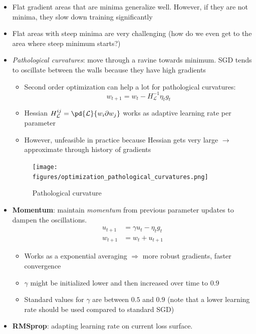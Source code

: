 \begin{itemize}
	\item Flat gradient areas that are minima generalize well. However, if they are not minima, they slow down training significantly
	\item Flat areas with steep minima are very challenging (how do we even get to the area where steep minimum starts?)
	\item \textit{Pathological curvatures}: move through a ravine towards minimum. SGD tends to oscillate between the walls because they have high gradients
	\begin{itemize}
		\item Second order optimization can help a lot for pathological curvatures: $$w_{t+1} = w_{t} - H_{\mathcal{L}}^{-1} \eta_t g_t$$
		\item Hessian $H_{\mathcal{L}}^{ij} = \pd{\mathcal{L}}{w_i\partial w_j}$ works as adaptive learning rate per parameter
		\item However, unfeasible in practice because Hessian gets very large $\rightarrow$ approximate through history of gradients
	\end{itemize}
	\begin{figure}[ht!]
		\centering
		\texttt{[image: figures/optimization\_pathological\_curvatures.png]}
		\caption{Pathological curvature}
		\label{fig:optimization_pathological_curvatures}
	\end{figure}
	\item \textbf{Momentum}: maintain \textit{momentum} from previous parameter updates to dampen the oscillations.
	\begin{equation*}
		\begin{split}
			u_{t+1} & = \gamma u_{t} - \eta_t g_t \\
			w_{t+1} & = w_{t} + u_{t+1}
		\end{split}
	\end{equation*}
	\begin{itemize}
		\item Works as a exponential averaging $\Rightarrow$ more robust gradients, faster convergence
		\item $\gamma$ might be initialized lower and then increased over time to $0.9$
		\item Standard values for $\gamma$ are between $0.5$ and $0.9$ (note that a lower learning rate should be used compared to standard SGD)
	\end{itemize}
	\item \textbf{RMSprop}: adapting learning rate on current loss surface.

\end{itemize}
